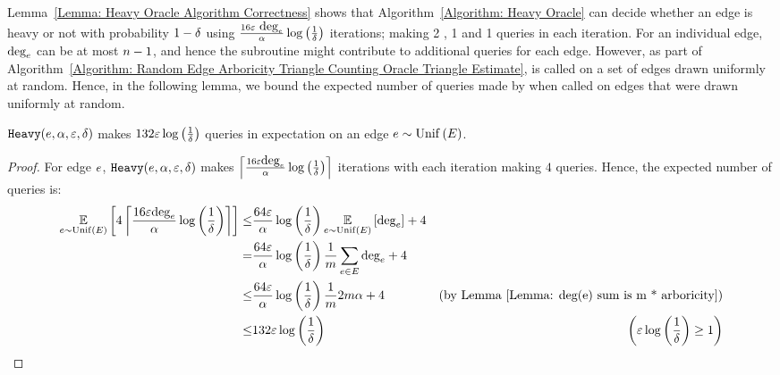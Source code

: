 Lemma~\ref{Lemma: Heavy Oracle Algorithm Correctness} shows that Algorithm~\ref{Algorithm: Heavy Oracle} can decide whether an edge is heavy or not with probability $1 - \delta$ using $\frac{16\varepsilon ~ \mbox{deg}_{e}}{\alpha}\log\left({\frac{1}{\delta}}\right)$ iterations; making 2 \degreeq{}, 1 \neighbourq{} and 1 \edgeexistsq{} queries in each iteration. For an individual edge, $\mbox{deg}_{e}$ can be at most $n-1$, and hence the subroutine might contribute to additional queries for each edge. However, as part of Algorithm~\ref{Algorithm: Random Edge Arboricity Triangle Counting Oracle Triangle Estimate}, \heavyoracle{} is called on a set of edges drawn uniformly at random. Hence, in the following lemma, we bound the expected number of queries made by \heavyoracle{} when called on edges that were drawn uniformly at random.

\begin{lemma}\label{Lemma: Heavy Oracle Query Count}
    $\texttt{Heavy}{\left({e,\alpha,\varepsilon,\delta}\right)}$ makes $132\varepsilon\log\left({\frac{1}{\delta}}\right)$ queries in expectation on an edge $e \sim \mathrm{Unif}\left({E}\right)$. 
    
\end{lemma}

\begin{proof}
   For edge $e$, $\texttt{Heavy}{\left({e,\alpha,\varepsilon,\delta}\right)}$ makes $\left\lceil{\frac{16\varepsilon\mbox{deg}_{e}}{\alpha}\log\left({\frac{1}{\delta}}\right)}\right\rceil$ iterations with each iteration making $4$ queries. Hence, the expected number of queries is:
   \begin{align*}
       \operatorname*{\mathbb{E}}_{e \sim \mathrm{Unif}\left({E}\right)}\left[{4\left\lceil{\frac{16\varepsilon\mbox{deg}_{e}}{\alpha}\log\left({\frac{1}{\delta}}\right)}\right\rceil}\right]
       \leq& \frac{64\varepsilon}{\alpha}\log\left({\frac{1}{\delta}}\right)\operatorname*{\mathbb{E}}_{e \sim \mathrm{Unif}\left({E}\right)}\left[{\mbox{deg}_{e}}\right]+ 4\\
       =& \frac{64\varepsilon}{\alpha}\log\left({\frac{1}{\delta}}\right)\frac{1}{m}\sum_{e \in E} \mbox{deg}_{e}+4\\
       \leq& \frac{64\varepsilon}{\alpha}\log\left({\frac{1}{\delta}}\right)\frac{1}{m}2m\alpha + 4&\text{(by Lemma~\ref{Lemma: deg(e) sum is m * arboricity})}\\
       \leq& 132\varepsilon\log\left({\frac{1}{\delta}}\right) &\left( \varepsilon\log\left({\frac{1}{\delta}}\right) \geq 1 \right)
   \end{align*}
\end{proof}








